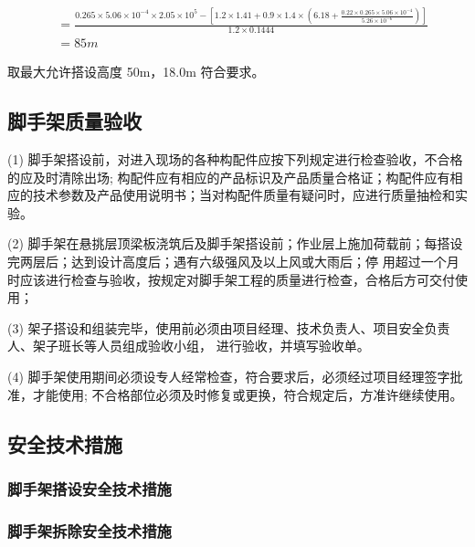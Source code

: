 \begin{align*}
[H] &=\frac{0.265\times 5.06\times10^{-4}\times 2.05\times10^5-[1.2\times 1.41+0.9\times 1.4\times(6.18+\frac{0.22\times 0.265\times 5.06\times 10^{-4}}{5.26\times 10^{-6}})]}{1.2\times 0.1444}\\
&=85m
\end{align*}

取最大允许搭设高度 50m，18.0m 符合要求。

\subsection{脚手架质量验收}

(1) 脚手架搭设前，对进入现场的各种构配件应按下列规定进行检查验收，不合格的应及时清除出场;
构配件应有相应的产品标识及产品质量合格证；构配件应有相应的技术参数及产品使用说明书；当对构配件质量有疑问时，应进行质量抽检和实
验。

(2) 脚手架在悬挑层顶梁板浇筑后及脚手架搭设前；作业层上施加荷载前；每搭设完两层后；达到设计高度后；遇有六级强风及以上风或大雨后；停
用超过一个月时应该进行检查与验收，按规定对脚手架工程的质量进行检查，合格后方可交付使用；

(3) 架子搭设和组装完毕，使用前必须由项目经理、技术负责人、项目安全负责人、架子班长等人员组成验收小组，
进行验收，并填写验收单。

(4) 脚手架使用期间必须设专人经常检查，符合要求后，必须经过项目经理签字批准，才能使用;
不合格部位必须及时修复或更换，符合规定后，方准许继续使用。 

\subsection{安全技术措施}
\subsubsection{脚手架搭设安全技术措施}

\subsubsection{脚手架拆除安全技术措施}
